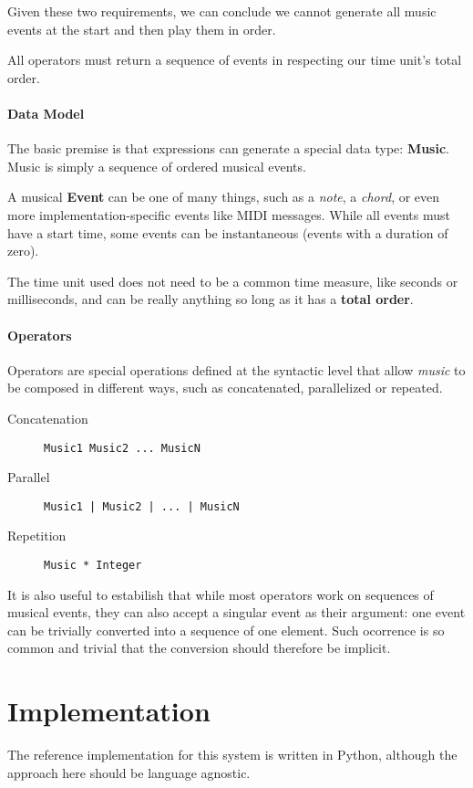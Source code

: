 \documentclass[a4paper,UKenglish,cleveref, autoref]{oasics-v2019}
\begin{document}
Given these two requirements, we can conclude we cannot generate all music events at the start and then play them in order. 

\begin{lemma}
\label{lemma:total-order} All operators must return a sequence of events in respecting our time unit's total order.
\end{lemma}

\paragraph*{Data Model}
The basic premise is that expressions can generate a special data type: \textbf{Music}. Music is simply a sequence of ordered musical events.

A musical \textbf{Event} can be one of many things, such as a \textit{note}, a \textit{chord}, or even more implementation-specific events like MIDI messages. While all events must have a start time, some events can be instantaneous (events with a duration of zero).

The time unit used does not need to be a common time measure, like seconds or milliseconds, and can be really anything so long as it has a \textbf{total order}.

\paragraph*{Operators}
Operators are special operations defined at the syntactic level that allow \textit{music} to be composed in different ways, such as concatenated, parallelized or repeated.

\begin{description}
    \item[Concatenation] \verb|Music1 Music2 ... MusicN|
    \item[Parallel] \verb'Music1 | Music2 | ... | MusicN'
    \item[Repetition] \verb'Music * Integer'
\end{description}

It is also useful to estabilish that while most operators work on sequences of musical events, they can also accept a singular event as their argument: one event can be trivially converted into a sequence of one element. Such ocorrence is so common and trivial that the conversion should therefore be implicit.

\section{Implementation}
The reference implementation for this system is written in Python, although the approach here should be language agnostic.
\end{document}
